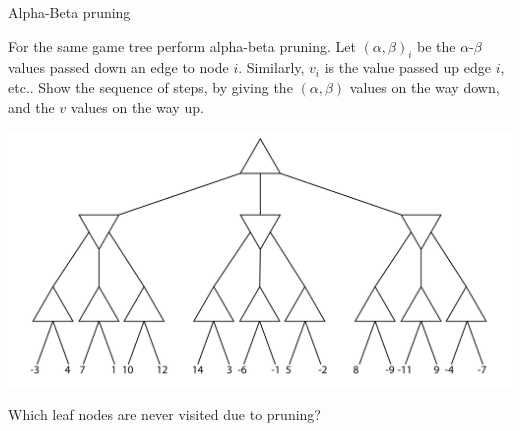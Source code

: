 \documentclass[twoside]{article}
\newcommand{\solutionspace}[4]{\fbox{\begin{minipage}[t][#1][t]{#2} \textbf{#3} 

\solution{}{#4} \end{minipage}}}
\begin{document}
\clearpage
\begin{problem} {Alpha-Beta pruning}

\begin{question} [10] For the same game tree perform alpha-beta pruning. Let $(\alpha, \beta)_{i}$ be the
  $\alpha$-$\beta$ values passed down an edge to node $i$.  Similarly,
  $v_i$ is the value passed up edge $i$, etc..  Show the sequence of
  steps, by giving the $(\alpha, \beta)$ values on the way down, and the $v$ values
  on the way up. 

\begin{center}
\includegraphics[width=\linewidth]{gametree.png}
\end{center}
\end{question}

\begin{question} [10]  Which leaf nodes are never visited due to pruning?

\solutionspace{2cm}{15cm}{}
{\Twob}

\end{question}

\end{problem}
\end{document}
